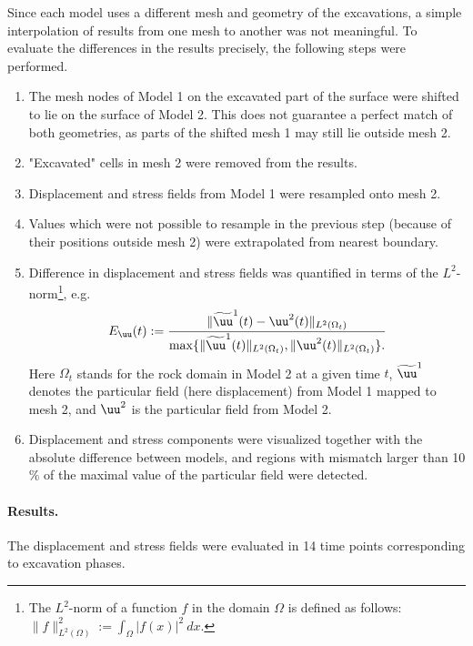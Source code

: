 Since each model uses a different mesh and geometry of the excavations, a simple interpolation of results from one mesh to another was not meaningful.
To evaluate the differences in the results precisely, the following steps were performed.
\begin{enumerate}
    \item The mesh nodes of Model 1 on the excavated part of the surface were shifted to lie on the surface of Model 2. This does not guarantee a perfect match of both geometries, as parts of the shifted mesh 1 may still lie outside mesh 2.
    \item "Excavated" cells in mesh 2 were removed from the results.
    \item Displacement and stress fields from Model 1 were resampled onto mesh 2.
    \item Values which were not possible to resample in the previous step (because of their positions outside mesh 2) were extrapolated from nearest boundary.
    \item Difference in displacement and stress fields was  quantified in terms of the $L^2$-norm\footnote{The $L^2$-norm of a function $f$ in the domain $\Omega$ is defined as follows: $\|f\|_{L^2(\Omega)}^2 := \int_{\Omega}|f(x)|^2~dx$.}, e.g.
    \[ E_\uu(t):= \frac{\|\widetilde\uu^1(t)-\uu^2(t)\|_{L^2(\Omega_t)}}{\max\{\|\widetilde\uu^1(t)\|_{L^2(\Omega_t)},\|\uu^2(t)\|_{L^2(\Omega_t)}\}. } \]
    Here $\Omega_t$ stands for the rock domain in Model 2 at a given time $t$, $\widetilde\uu^1$ denotes the particular field (here displacement) from Model 1 mapped to mesh 2, and $\uu^2$ is the particular field from Model 2.
    \item Displacement and stress components were visualized 
    together with the absolute difference between models, and regions with mismatch larger than 10 \% of the maximal value of the particular field were detected.
\end{enumerate}


\paragraph{Results.}

The displacement and stress fields were evaluated in 14 time points corresponding to excavation phases.

